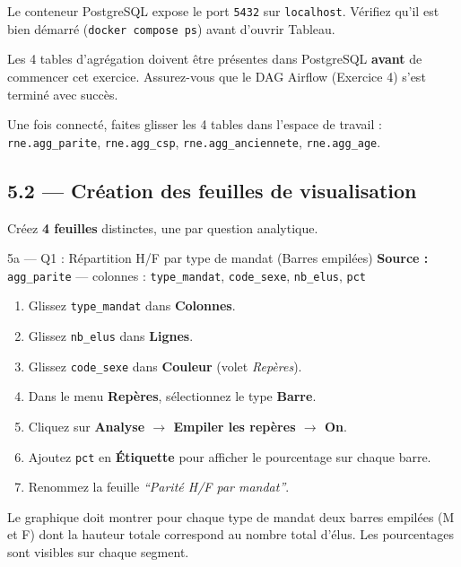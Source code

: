 \documentclass[11pt,a4paper]{article}
\begin{document}
\begin{hint}
Le conteneur PostgreSQL expose le port \texttt{5432} sur \texttt{localhost}. Vérifiez qu'il est bien démarré (\texttt{docker compose ps}) avant d'ouvrir Tableau.
\end{hint}

\begin{attention}
Les 4 tables d'agrégation doivent être présentes dans PostgreSQL \textbf{avant} de commencer cet exercice. Assurez-vous que le DAG Airflow (Exercice 4) s'est terminé avec succès.
\end{attention}

Une fois connecté, faites glisser les 4 tables dans l'espace de travail :
\texttt{rne.agg\_parite}, \texttt{rne.agg\_csp}, \texttt{rne.agg\_anciennete}, \texttt{rne.agg\_age}.

\subsection*{5.2 — Création des feuilles de visualisation}

Créez \textbf{4 feuilles} distinctes, une par question analytique.

\begin{exercice}{5a — Q1 : Répartition H/F par type de mandat (Barres empilées)}
\textbf{Source :} \texttt{agg\_parite} — colonnes : \texttt{type\_mandat}, \texttt{code\_sexe}, \texttt{nb\_elus}, \texttt{pct}

\begin{enumerate}[leftmargin=*]
  \item Glissez \texttt{type\_mandat} dans \textbf{Colonnes}.
  \item Glissez \texttt{nb\_elus} dans \textbf{Lignes}.
  \item Glissez \texttt{code\_sexe} dans \textbf{Couleur} (volet \textit{Repères}).
  \item Dans le menu \textbf{Repères}, sélectionnez le type \textbf{Barre}.
  \item Cliquez sur \textbf{Analyse $\to$ Empiler les repères $\to$ On}.
  \item Ajoutez \texttt{pct} en \textbf{Étiquette} pour afficher le pourcentage sur chaque barre.
  \item Renommez la feuille \textit{``Parité H/F par mandat''}.
\end{enumerate}

\begin{validation}
Le graphique doit montrer pour chaque type de mandat deux barres empilées (M et F) dont la hauteur totale correspond au nombre total d'élus. Les pourcentages sont visibles sur chaque segment.
\end{validation}
\end{exercice}
\end{document}
